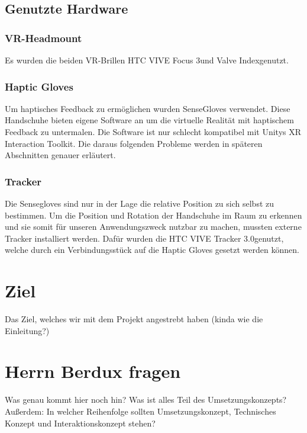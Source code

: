 \subsection{Genutzte Hardware}

\subsubsection{VR-Headmount}
Es wurden die beiden VR-Brillen \dq HTC VIVE Focus 3\dq und \dq Valve Index\dq genutzt.

\subsubsection{Haptic Gloves}
Um haptisches Feedback zu ermöglichen wurden \dq SenseGloves \dq verwendet. Diese Handschuhe bieten eigene Software an um die virtuelle Realität mit haptischem Feedback zu untermalen. Die Software ist nur schlecht kompatibel mit Unitys XR Interaction Toolkit. Die daraus folgenden Probleme werden in späteren Abschnitten genauer erläutert. 

\subsubsection{Tracker}
Die Sensegloves sind nur in der Lage die relative Position zu sich selbst zu bestimmen. Um die Position und Rotation der Handschuhe im Raum zu erkennen und sie somit für unseren Anwendungszweck nutzbar zu machen, mussten externe Tracker installiert werden. Dafür wurden die \dq HTC VIVE Tracker 3.0\dq genutzt, welche durch ein Verbindungsstück auf die Haptic Gloves gesetzt werden können.

\section{Ziel}
Das Ziel, welches wir mit dem Projekt angestrebt haben (kinda wie die Einleitung?)

\section{Herrn Berdux fragen}
Was genau kommt hier noch hin? Was ist alles Teil des Umsetzungskonzepts?
Außerdem: In welcher Reihenfolge sollten Umsetzungskonzept, Technisches Konzept und Interaktionskonzept stehen?